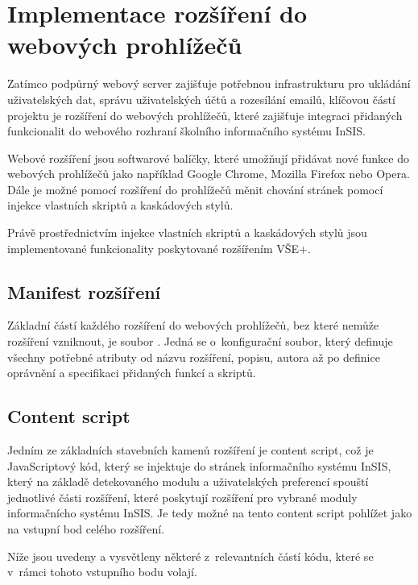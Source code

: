 \chapter{Implementace rozšíření do webových prohlížečů}

Zatímco podpůrný webový server zajišťuje potřebnou infrastrukturu pro ukládání uživatelských dat, správu uživatelských účtů a rozesílání emailů, klíčovou částí projektu je rozšíření do webových prohlížečů, které zajišťuje integraci přidaných funkcionalit do webového rozhraní školního informačního systému InSIS.

Webové rozšíření jsou softwarové balíčky, které umožňují přidávat nové funkce do webových prohlížečů jako například Google Chrome, Mozilla Firefox nebo Opera. Dále je možné pomocí rozšíření do prohlížečů měnit chování stránek pomocí injekce vlastních skriptů a kaskádových stylů.

Právě prostřednictvím injekce vlastních skriptů a kaskádových stylů jsou implementované funkcionality poskytované rozšířením VŠE+.

\section{Manifest rozšíření}

Základní částí každého rozšíření do webových prohlížečů, bez které nemůže rozšíření vzniknout, je soubor . Jedná se o~konfigurační soubor, který definuje všechny potřebné atributy od názvu rozšíření, popisu, autora až po definice oprávnění a specifikaci přidaných funkcí a skriptů. 


\section{Content script}

Jedním ze základních stavebních kamenů rozšíření je content script, což je JavaScriptový kód, který se injektuje do stránek informačního systému InSIS, který na základě detekovaného modulu a uživatelských preferencí spouští jednotlivé části rozšíření, které poskytují rozšíření pro vybrané moduly informačnícho systému InSIS. Je tedy možné na tento content script pohlížet jako na vstupní bod celého rozšíření.

Níže jsou uvedeny a vysvětleny některé z~relevantních částí kódu, které se v~rámci tohoto vstupního bodu volají.

